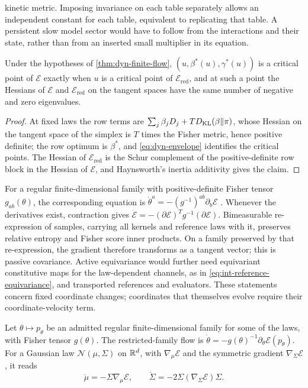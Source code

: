 kinetic metric. Imposing invariance on each table separately allows an independent constant for each table, equivalent to replicating that table. A persistent slow model sector would have to follow from the interactions and their state, rather than from an inserted small multiplier in its equation.

Under the hypotheses of \cref{thm:dyn-finite-flow}, $(u,\beta^*(u),\gamma^*(u))$ is a critical point of $\mathcal E$ exactly when $u$ is a critical point of $\mathcal E_{\mathrm{red}}$, and at such a point the Hessians of $\mathcal E$ and $\mathcal E_{\mathrm{red}}$ on the tangent spaces have the same number of negative and zero eigenvalues.
\begin{proof}
At fixed laws the row terms are $\sum_j\beta_jD_j+TD_{\mathrm{KL}}(\beta\Vert\pi)$, whose Hessian on the tangent space of the simplex is $T$ times the Fisher metric, hence positive definite; the row optimum is $\beta^*$, and \cref{eq:dyn-envelope} identifies the critical points. The Hessian of $\mathcal E_{\mathrm{red}}$ is the Schur complement of the positive-definite row block in the Hessian of $\mathcal E$, and Haynsworth's inertia additivity \citep{Haynsworth1968} gives the claim.
\end{proof}

For a regular finite-dimensional family with positive-definite Fisher tensor $g_{ab}(\theta)$, the corresponding equation is $\dot\theta^a=-(g^{-1})^{ab}\partial_b\mathcal E$ \citep{Amari1998}. Whenever the derivatives exist, contraction gives $\dot{\mathcal E}=-(\partial\mathcal E)^Tg^{-1}(\partial\mathcal E)$. Bimeasurable re-expression of samples, carrying all kernels and reference laws with it, preserves relative entropy and Fisher score inner products. On a family preserved by that re-expression, the gradient therefore transforms as a tangent vector; this is passive covariance. Active equivariance would further need equivariant constitutive maps for the law-dependent channels, as in \cref{eq:int-reference-equivariance}, and transported references and evaluators. These statements concern fixed coordinate changes; coordinates that themselves evolve require their coordinate-velocity term.

Let $\theta\mapsto p_\theta$ be an admitted regular finite-dimensional family for some of the laws, with Fisher tensor $g(\theta)$. The restricted-family flow is $\dot\theta=-g(\theta)^{-1}\partial_\theta\mathcal E(p_\theta)$. For a Gaussian law $\mathcal N(\mu,\Sigma)$ on $\mathbb R^d$, with $\nabla_\mu\mathcal E$ and the symmetric gradient $\nabla_\Sigma\mathcal E$, it reads
\begin{equation}
 \dot\mu=-\Sigma\nabla_\mu\mathcal E,
 \qquad
 \dot\Sigma=-2\Sigma(\nabla_\Sigma\mathcal E)\Sigma.
 \label{eq:dyn-gaussian-flow}
\end{equation}

